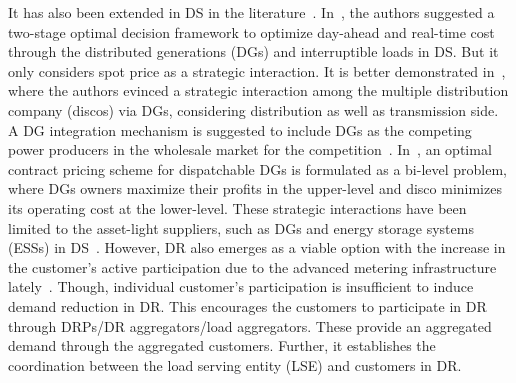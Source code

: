 \documentclass[journal]{IEEEtran}
\begin{document}
It has also been extended in DS in the literature~\cite{algarni2009generic,haghighat2012bilevel,jimenez2007competitive,boroumand2015electricity}. In~\cite{algarni2009generic}, the authors suggested a two-stage optimal decision framework to optimize day-ahead and real-time cost through the distributed generations (DGs) and interruptible loads in DS. But it only considers spot price as a strategic interaction. It is better demonstrated in~\cite{haghighat2012bilevel}, where the authors evinced a strategic interaction among the multiple distribution company (discos) via DGs, considering distribution as well as transmission side. A DG integration mechanism is suggested to include DGs as the competing power producers in the wholesale market for the competition~\cite{jimenez2007competitive}. In~\cite{lopez2010optimal}, an optimal contract pricing scheme for dispatchable DGs is formulated as a bi-level problem, where DGs owners maximize their profits in the upper-level and disco minimizes its operating cost at the lower-level. These strategic interactions have been limited to the asset-light suppliers, such as DGs and energy storage systems (ESSs) in DS~\cite{boroumand2015electricity}. However, DR also emerges as a viable option with the increase in the customer’s active participation due to the advanced metering infrastructure lately~\cite{faruqui2012ethics,haider2020toward}. Though, individual customer's participation is insufficient to induce demand reduction in DR. This encourages the customers to participate in DR through DRPs/DR aggregators/load aggregators\mbox{\cite{li2016dynamic,sarker2014optimal,wang2019ensuring}}. These provide an aggregated demand through the aggregated customers. Further, it establishes the coordination between the load serving entity (LSE) and customers in DR.  
\end{document}

